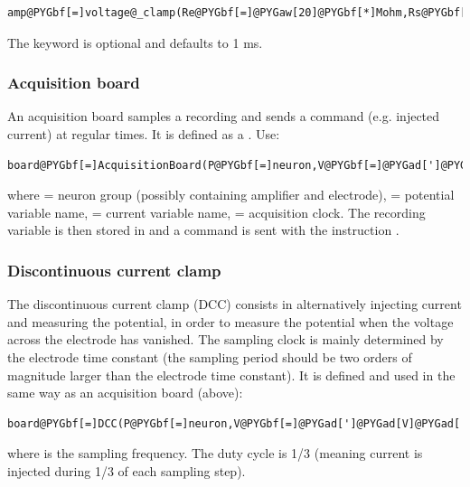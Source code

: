 \documentclass[letterpaper,10pt,english]{manual}
\begin{document}
\begin{Verbatim}[commandchars=@\[\]]
amp@PYGbf[=]voltage@_clamp(Re@PYGbf[=]@PYGaw[20]@PYGbf[*]Mohm,Rs@PYGbf[=]@PYGaw[10]@PYGbf[*]Mohm,tau@_u@PYGbf[=]@PYGaw[1]@PYGbf[*]ms)
\end{Verbatim}

The  keyword is optional and defaults to 1 ms.


\subsubsection{Acquisition board}

An acquisition board samples a recording
and sends a command (e.g. injected current)
at regular times. It is defined as a
\hyperlink{brian.NeuronGroup}{}.
Use:

\begin{Verbatim}[commandchars=@\[\]]
board@PYGbf[=]AcquisitionBoard(P@PYGbf[=]neuron,V@PYGbf[=]@PYGad[']@PYGad[V]@PYGad['],I@PYGbf[=]@PYGad[']@PYGad[I]@PYGad['],clock)
\end{Verbatim}

where  = neuron group (possibly containing amplifier and electrode),
 = potential variable name,
 = current variable name,
 = acquisition clock. The recording variable is then stored in
 and a command is sent with the instruction .


\subsubsection{Discontinuous current clamp}

The discontinuous current clamp (DCC) consists in alternatively injecting current
and measuring the potential, in order to measure the potential when the voltage
across the electrode has vanished. The sampling clock is mainly determined by the
electrode time constant (the sampling period should be two orders of magnitude larger
than the electrode time constant).
It is defined and used in the same way as an acquisition board (above):

\begin{Verbatim}[commandchars=@\[\]]
board@PYGbf[=]DCC(P@PYGbf[=]neuron,V@PYGbf[=]@PYGad[']@PYGad[V]@PYGad['],I@PYGbf[=]@PYGad[']@PYGad[I]@PYGad['],frequency@PYGbf[=]@PYGaw[2]@PYGbf[*]kHz)
\end{Verbatim}

where  is the sampling frequency. The duty cycle is 1/3
(meaning current is injected during 1/3 of each sampling step).
\end{document}
